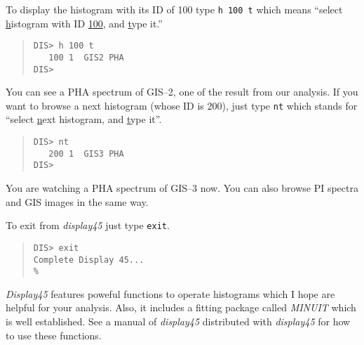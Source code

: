 To display the histogram with its ID of 100
type {\tt h 100 t} which means
``select \underline{h}istogram with ID \underline{100},
and \underline{t}ype it.''

\begin{quote}\baselineskip 3.2mm\begin{verbatim}
DIS> h 100 t
   100 1  GIS2 PHA
DIS> 
\end{verbatim}\end{quote}

You can see a PHA spectrum of GIS--2,
one of the result from our analysis.
If you want to browse a next histogram (whose ID is 200),
just type {\tt nt} which stands for
``select \underline{n}ext histogram, and \underline{t}ype it''.

\begin{quote}\baselineskip 3.2mm\begin{verbatim}
DIS> nt
   200 1  GIS3 PHA
DIS> 
\end{verbatim}\end{quote}

You are watching a PHA spectrum of GIS--3 now.
You can also browse PI spectra and GIS images in the same way.

To exit from {\em display45}
just type {\tt exit}.

\begin{quote}\baselineskip 3.2mm\begin{verbatim}
DIS> exit
Complete Display 45...
%
\end{verbatim}\end{quote}

{\em Display45} features poweful functions to operate histograms
which I hope are helpful for your analysis.
Also,
it includes a fitting package called {\em MINUIT} which is well established.
See a manual of {\em display45} distributed with {\em display45}
for how to use these functions.
